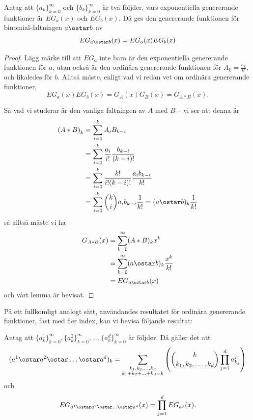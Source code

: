 \documentclass[nobib]{tufte-handout}
\begin{document}
\begin{lemma}
  Antag att $\{a_k\}_{k=0}^\infty$ och $\{b_k\}_{k=0}^\infty$ är två följder, vars exponentiella genererande funktioner är $EG_a(x)$ och $EG_b(x)$. Då ges den genererande funktionen för binomial-faltningen $a \ostar b$ av
  $$EG_{a \ostar b}(x) = EG_a(x)EG_b(x)$$

  \begin{proof}
    Lägg märke till att $EG_a$ inte bara är den exponentiella genererande funktionen för $a$, utan också är den ordinära genererande funktionen för $A_k = \frac{a_k}{k!}$, och likaledes för $b$. Alltså måste, enligt vad vi redan vet om ordinära genererande funktioner,
    $$EG_a(x)EG_b(x) = G_{A}(x)G_{B}(x) = G_{A * B}(x).$$

    Så vad vi studerar är den vanliga faltningen av $A$ med $B$ -- vi ser att denna är
    \begin{align*}
      \left(A * B\right)_k &= \sum_{i=0}^{k} A_{i}B_{k-i}\\
      &= \sum_{i=0}^{k} \frac{a_i}{i!}\frac{b_{k-i}}{(k-i)!}\\
      &= \sum_{i=0}^{k} \frac{k!}{i!(k-i)!}\frac{a_i b_{k-i}}{k!}\\
      &= \sum_{i=0}^{k} \binom{k}{i}a_i b_{k-i}\frac{1}{k!} = (a \ostar b)_k \frac{1}{k!}
    \end{align*}
    så alltså måste vi ha
    \begin{align*}
      G_{A * B}(x) &= \sum_{k=0}^\infty (A*B)_k x^k\\
      &= \sum_{k=0}^{\infty}(a\ostar b)_k \frac{x^k}{k!}\\
      &= EG_{a \ostar b}(x)
    \end{align*}
    och vårt lemma är bevisat.
  \end{proof}
\end{lemma}

På ett fullkomligt analogt sätt, användandes resultatet för ordinära genererande funktioner, fast med fler index, kan vi bevisa följande resultat:
\begin{lemma}
  Antag att $\{a^1_k\}_{k=0}^\infty, \{a^2_k\}_{k=0}^\infty, \ldots, \{a^d_k\}_{k=0}^\infty$ är följder. Då gäller det att
  $$(a^1 \ostar a^2 \ostar \ldots \ostar a^d)_k = \sum_{\substack{k_1, k_2, \ldots, k_d\\k_1 + k_2 + \ldots + k_d = k}} \left(\binom{k}{k_1, k_2, \ldots, k_d} \prod_{j=1}^{d} a^j_{k_j}\right)$$
  och
  $$EG_{a^1 \ostar a^2 \ostar \ldots \ostar a^d}(x) = \prod_{j=1}^{d} EG_{a^j}(x).$$
\end{lemma}
\end{document}
